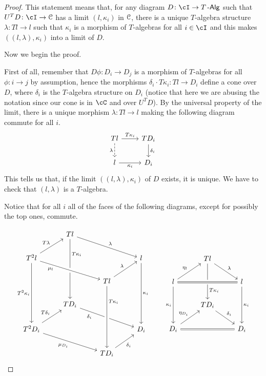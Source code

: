 \documentclass[a4paper,11pt,oneside,openany]{scrbook}
\begin{document}
\begin{proof}
	This statement means that, for any diagram $D\colon\cI\rightarrow T\Alg$
	such that $U^TD\colon\cI\rightarrow\C$ has a limit $(l,\kappa_i)$ in $\operatorname{\mathcal{C}}$,
	there is a unique $T$-algebra structure $\lambda\colon Tl\rightarrow l$ such
	that $\kappa_i$ is a morphism of $T$-algebras for all $i\in\cI$ and this
	makes $((l,\lambda),\kappa_i)$ into a limit of $D$.

	Now we begin the proof.

	First of all, remember that $D\phi\colon D_i\rightarrow D_j$ is a morphism
	of $T$-algebras for all $\phi\colon i\rightarrow j$ by assumption, hence the
	morphisms $\delta_i\cdot T\kappa_i\colon Tl\rightarrow D_i$ define a cone
	over $D$, where $\delta_i$ is the $T$-algebra structure on $D_i$ (notice
	that here we are abusing the notation since our cone is in $\cC$ and over
	$U^TD$). By the
	universal property of the limit, there is a unique morphism $\lambda\colon
		Tl\rightarrow l$ making the following diagram commute for all $i$.
	\[
		\begin{tikzcd}
			Tl\ar[d, dashed, "\lambda"'] \ar[r, "T\kappa_i"]
			& TD_i\ar[d, "\delta_i"]\\
			l\ar[r, "\kappa_i"']
			& D_i
		\end{tikzcd}
	\]
	This tells us that, if the limit $((l,\lambda),\kappa_i)$ of $D$ exists, it
	is unique. We have to check that $(l,\lambda)$ is a $T$-algebra.

	Notice that for all $i$ all of the faces of the following diagrams, except
	for possibly the top ones, commute.

	\[
		\begin{tikzcd}
			& Tl\ar[drr, "\lambda"]\ar[ddd, "T\kappa_i" near start] \\
			T^2l\ar[ur, "T\lambda"]\ar[drr, crossing over, "\mu_l" near start, swap]\ar[ddd, "T^2\kappa_i"']
			&&& l\ar[ddd, "\kappa_i"] \\
			&& Tl\ar[ur, "\lambda"]%
			\\
			& TD_i\ar[drr, swap, "\delta_i" near start] \\
			T^2D_i\ar[ur, "T\delta_i"]\ar[drr, "\mu_{D_i}"']
			&&& D_i \\
			&& TD_i\ar[ur, "\delta_i"'] \ar[from=uuu,crossing over,  "T\kappa_i" near start]
		\end{tikzcd}
		\quad\quad
		\begin{tikzcd}
			& Tl\ar[dr, "\lambda"]\ar[dd, "T\kappa_i" near end] \\
			l\ar[ur, "\eta_l"]\ar[rr, crossing over, equal]\ar[dd, swap, "\kappa_i"]
			&& l\ar[dd, "\kappa_i"] \\
			& TD_i\ar[dr, "\delta_i"] \\
			D_i\ar[ur, "\eta_{D_i}"]\ar[rr, equal]
			&& D_i
		\end{tikzcd}
	\]


\end{proof}
\end{document}

